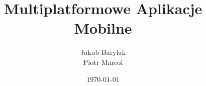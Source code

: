 %
%
%
% 
%
%

\documentclass[12pt,a4paper,titlepage,hidelinks]{article}

\usepackage[utf8]{inputenc}
\usepackage[polish]{babel}
\usepackage[T1]{fontenc}
\usepackage{subfiles}
\usepackage{float}
\usepackage{hyperref}
\usepackage{color}
\usepackage{amsmath}
\usepackage{hyperref}
\usepackage{graphicx}

\usepackage{mathpazo} %


\newcommand\myemptypage{
	\null
	\thispagestyle{empty}
	\newpage
}

\newcommand\pageCounterMinusOne{
	\addtocounter{page}{-1}
}

\title{\Huge{Multiplatformowe Aplikacje Mobilne}}
\author{Jakub Barylak\\Piotr Marcol}
\date{\today}






